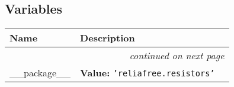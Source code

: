 
  \subsection{Variables}

    \vspace{-1cm}
\hspace{\varindent}\begin{longtable}{|p{\varnamewidth}|p{\vardescrwidth}|l}
\cline{1-2}
\cline{1-2} \centering \textbf{Name} & \centering \textbf{Description}& \\
\cline{1-2}
\endhead\cline{1-2}\multicolumn{3}{r}{\small\textit{continued on next page}}\\\endfoot\cline{1-2}
\endlastfoot\raggedright \_\-\_\-p\-a\-c\-k\-a\-g\-e\-\_\-\_\- & \raggedright \textbf{Value:} 
{\tt \texttt{'}\texttt{reliafree.resistors}\texttt{'}}&\\
\cline{1-2}
\end{longtable}

